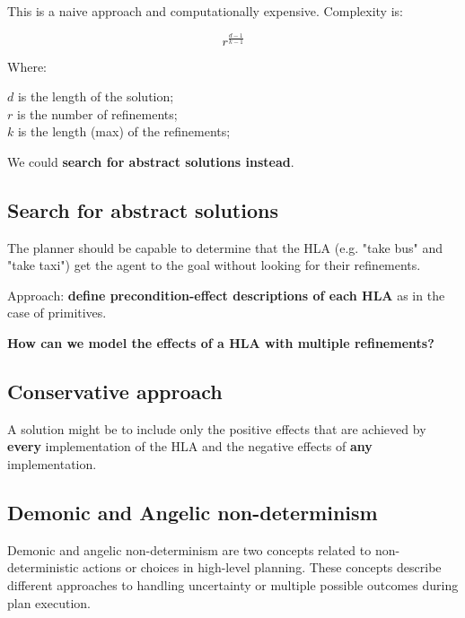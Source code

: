 \documentclass{article}
\begin{document}
This is a naive approach and computationally expensive. Complexity is:

\begin{equation}
    r^{\frac{d-1}{k-1}}
\end{equation}

Where:

\begin{center}
    $d$ is the length of the solution;\\
    $r$ is the number of refinements;\\
    $k$ is the length (max) of the refinements;
\end{center}

We could \textbf{search for abstract solutions instead}.

\subsection{Search for abstract solutions}

The planner should be capable to determine that the HLA (e.g. "take bus" and "take taxi") get the agent to the goal without looking for their refinements. \\

\begin{center}
    Approach: \textbf{define precondition-effect descriptions of each HLA} as in the case of primitives.
\end{center}

\textbf{How can we model the effects of a HLA with multiple refinements?}

\subsection{Conservative approach}

A solution might be to include only the positive effects that are achieved by \textbf{every} implementation of the HLA and the negative effects of \textbf{any} implementation.

\newpage

\subsection{Demonic and Angelic non-determinism}

Demonic and angelic non-determinism are two concepts related to non-deterministic actions or choices in high-level planning. These concepts describe different approaches to handling uncertainty or multiple possible outcomes during plan execution.
\end{document}
